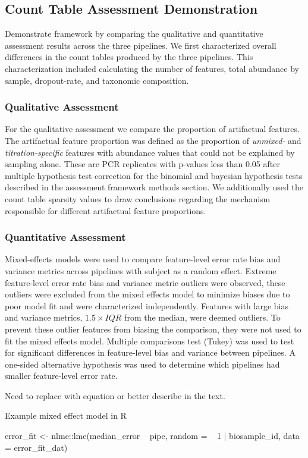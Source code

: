 \documentclass{bmcart}
\begin{document}
\subsection*{Count Table Assessment Demonstration}
Demonstrate framework by comparing the qualitative and quantitative assessment results across the three pipelines.
We first characterized overall differences in the count tables produced by the three pipelines.
This characterization included calculating the number of features, total abundance by sample, dropout-rate, and taxonomic composition.

\subsubsection*{Qualitative Assessment}
For the qualitative assessment we compare the proportion of artifactual features.
The artifactual feature proportion was defined as the proportion of \emph{unmixed-} and \emph{titration-specific} features with abundance values that could not be explained by sampling alone.
These are PCR replicates with p-values less than 0.05 after multiple hypothesis test correction for the binomial and bayesian hypothesis tests described in the assessment framework methods section.
We additionally used the count table sparsity values to draw conclusions regarding the mechanism responsible for different artifactual feature proportions.

\subsubsection*{Quantitative Assessment}
Mixed-effects models were used to compare feature-level
error rate bias and variance metrics across pipelines with subject as a
random effect. Extreme feature-level error rate bias and variance metric
outliers were observed, these outliers were excluded from the mixed
effects model to minimize biases due to poor model fit and were
characterized independently.
Features with large bias and variance metrics, \(1.5\times IQR\) from the median, were deemed outliers.
To prevent these outlier features from biasing the
comparison, they were not used to fit the mixed effects model. Multiple
comparisons test (Tukey) was used to test for significant differences in
feature-level bias and variance between pipelines. A one-sided
alternative hypothesis was used to determine which pipelines had smaller
feature-level error rate.

Need to replace with equation or better describe in the text.
\begin{verbatim*}
Example mixed effect model in R

error_fit <- nlme::lme(median_error ~ pipe, random =  ~ 1 | biosample_id, data = error_fit_dat)
\end{verbatim*}
\end{document}
